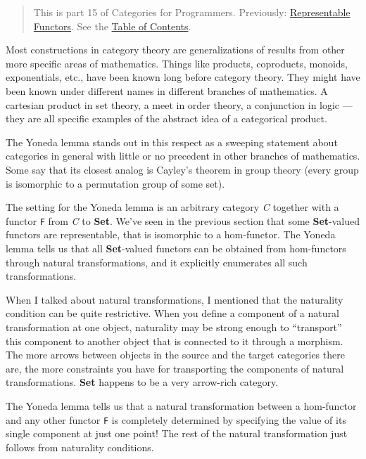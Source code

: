 \begin{quote}
This is part 15 of Categories for Programmers. Previously:
\href{https://bartoszmilewski.com/2015/07/29/representable-functors/}{Representable
Functors}. See the
\href{https://bartoszmilewski.com/2014/10/28/category-theory-for-programmers-the-preface/}{Table
of Contents}.
\end{quote}

Most constructions in category theory are generalizations of results
from other more specific areas of mathematics. Things like products,
coproducts, monoids, exponentials, etc., have been known long before
category theory. They might have been known under different names in
different branches of mathematics. A cartesian product in set theory, a
meet in order theory, a conjunction in logic --- they are all specific
examples of the abstract idea of a categorical product.

The Yoneda lemma stands out in this respect as a sweeping statement
about categories in general with little or no precedent in other
branches of mathematics. Some say that its closest analog is Cayley's
theorem in group theory (every group is isomorphic to a permutation
group of some set).

The setting for the Yoneda lemma is an arbitrary category \emph{C}
together with a functor \texttt{F} from \emph{C} to \textbf{Set}. We've
seen in the previous section that some \textbf{Set}-valued functors are
representable, that is isomorphic to a hom-functor. The Yoneda lemma
tells us that all \textbf{Set}-valued functors can be obtained from
hom-functors through natural transformations, and it explicitly
enumerates all such transformations.

When I talked about natural transformations, I mentioned that the
naturality condition can be quite restrictive. When you define a
component of a natural transformation at one object, naturality may be
strong enough to ``transport'' this component to another object that is
connected to it through a morphism. The more arrows between objects in
the source and the target categories there are, the more constraints you
have for transporting the components of natural transformations.
\textbf{Set} happens to be a very arrow-rich category.

The Yoneda lemma tells us that a natural transformation between a
hom-functor and any other functor \texttt{F} is completely determined by
specifying the value of its single component at just one point! The rest
of the natural transformation just follows from naturality conditions.

